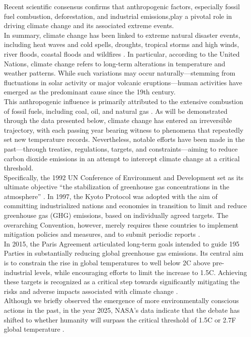 \documentclass[12pt]{Definitions/academia}
\begin{document}
Recent scientific consensus confirms that anthropogenic factors, especially
fossil fuel combustion, deforestation, and industrial emissions,play
a pivotal role in driving climate change and its associated extreme
events. \\
In summary, climate change has been linked to extreme natural
disaster events, including heat waves and cold spells, droughts, tropical
storms and high winds, river floods, coastal floods \textit{\cite{Dey 2021}}
and wildfires \textit{\cite{Kopitsa,United Nations  2022}}. In particular,
according to the United Nations, climate change refers to long-term
alterations in temperature and weather patterns. While such variations
may occur naturally---stemming from fluctuations in solar activity
or major volcanic eruptions---human activities have emerged as the
predominant cause since the 19th century. \\This anthropogenic influence
is primarily attributed to the extensive combustion of fossil fuels,
including coal, oil, and natural gas \textit{\cite{United Nations}}.
As will be demonstrated through the data presented below, climate
change has entered an irreversible trajectory, with each passing year
bearing witness to phenomena that repeatedly set new temperature records.
Nevertheless, notable efforts have been made in the past---through
treaties, regulations, targets, and constraints---aiming to reduce
carbon dioxide emissions in an attempt to intercept climate change
at a critical threshold.\\
 Specifically, the 1992 UN Conference of Environment
and Development set as its ultimate objective \textquotedblleft the
stabilization of greenhouse gas concentrations in the atmosphere\textquotedblright{}
\textit{\cite{United Nations 1992}}. In 1997, the Kyoto Protocol
was adopted with the aim of committing industrialized nations and
economies in transition to limit and reduce greenhouse gas (GHG) emissions,
based on individually agreed targets. The overarching Convention,
however, merely requires these countries to implement mitigation policies
and measures, and to submit periodic reports \textit{\cite{United Nations 1997}.}\\
In 2015, the Paris Agreement articulated long-term goals intended
to guide 195 Parties in substantially reducing global greenhouse gas
emissions. Its central aim is to constrain the rise in global temperatures
to well below 2\textdegree C above pre-industrial levels, while encouraging efforts
to limit the increase to 1.5\textdegree C. Achieving these targets is recognized
as a critical step towards significantly mitigating the risks and
adverse impacts associated with climate change \textit{\cite{United Nations 2015}.}\\
Although we briefly observed the emergence of more environmentally
conscious actions in the past, in the year 2025, NASA's data
indicate that the debate has shifted to whether humanity will surpass
the critical threshold of 1.5\textdegree C or 2.7\textdegree F global temperature \textit{\cite{NASA 2024}}.
\end{document}
